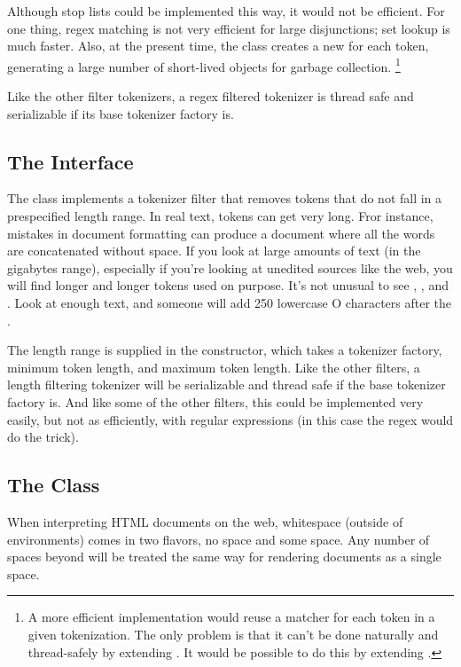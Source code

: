 Although stop lists could be implemented this way, it would not be
efficient.  For one thing, regex matching is not very efficient for
large disjunctions; set lookup is much faster.  Also, at the present
time, the class creates a new  for each token,
generating a large number of short-lived objects for garbage
collection.%
%
\footnote{A more efficient implementation would reuse a matcher for
each token in a given tokenization.  The only problem is that it can't
be done naturally and thread-safely by extending
.  It would be possible to do this
by extending .}
%

Like the other filter tokenizers, a regex filtered tokenizer is
thread safe and serializable if its base tokenizer factory is.


\subsection{The  Interface}

The class  implements a tokenizer
filter that removes tokens that do not fall in a prespecified length
range.  In real text, tokens can get very long.  Fror instance,
mistakes in document formatting can produce a document where all
the words are concatenated without space.  If you look at large
amounts of text (in the gigabytes range), especially if you're
looking at unedited sources like the web, you will find longer
and longer tokens used on purpose.  It's not unusual to see
, , and .  Look
at enough text, and someone will add 250 lowercase O characters
after the .

The length range is supplied in the constructor, which takes a
tokenizer factory, minimum token length, and maximum token length.
Like the other filters, a length filtering tokenizer will be
serializable and thread safe if the base tokenizer factory is.  And
like some of the other filters, this could be implemented very easily,
but not as efficiently, with regular expressions (in this case the
regex  would do the
trick).

\subsection{The  Class}

When interpreting HTML documents on the web, whitespace (outside of
 environments) comes in two flavors, no space and some
space.  Any number of spaces beyond will be treated the same way for
rendering documents as a single space.

